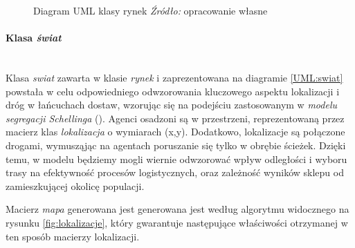 \documentclass[polish, twoside, 12pt, a4paper]{article}
\theoremstyle{definition}
\theoremstyle{plain}
\theoremstyle{remark}
\begin{document}
\begin{figure}[hbt]
  \centering
{}
  \captionsetup{margin=10pt,font=small,labelfont=bf,width=.8\textwidth}
  \caption[Diagram UML klasy rynek]{Diagram UML klasy rynek \textit{Źródło:} opracowanie własne}\label{UML:rynek}
\end{figure}


\paragraph{Klasa \textit{świat}}\mbox{}\\

Klasa \textit{swiat} zawarta w klasie \textit{rynek} i zaprezentowana na diagramie \ref{UML:swiat} powstała w celu odpowiedniego odwzorowania kluczowego aspektu lokalizacji i dróg w łańcuchach dostaw, wzorując się na podejściu zastosowanym w \textit{modelu segregacji Schellinga} (\cite{Schelling1971}). Agenci osadzoni są w przestrzeni, reprezentowaną przez macierz klas \textit{lokalizacja} o wymiarach (x,y). Dodatkowo, lokalizacje są połączone drogami, wymusząjąc na agentach poruszanie się tylko w obrębie ścieżek. Dzięki temu, w modelu będziemy mogli wiernie odwzorować wpływ odległości i wyboru trasy na efektywność procesów logistycznych, oraz zależność wyników sklepu od zamieszkującej okolicę populacji. 

Macierz \textit{mapa} generowana jest generowana jest według algorytmu widocznego na rysunku \ref{fig:lokalizacje}, który gwarantuje następujące właściwości otrzymanej w ten sposób macierzy lokalizacji. 
\end{document}
